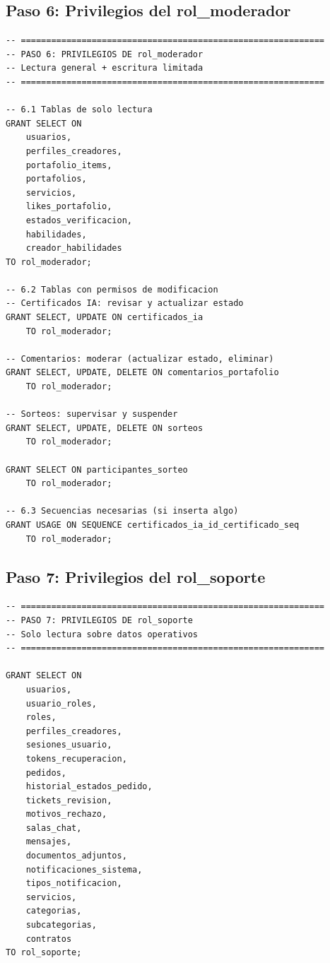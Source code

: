 \documentclass[conference, onecolumn]{IEEEtran}
\begin{document}
\subsection{Paso 6: Privilegios del rol\_moderador}

\begin{lstlisting}[caption={Privilegios granulares del moderador}, label={lst:priv_moderador}]
-- ============================================================
-- PASO 6: PRIVILEGIOS DE rol_moderador
-- Lectura general + escritura limitada
-- ============================================================

-- 6.1 Tablas de solo lectura
GRANT SELECT ON
    usuarios,
    perfiles_creadores,
    portafolio_items,
    portafolios,
    servicios,
    likes_portafolio,
    estados_verificacion,
    habilidades,
    creador_habilidades
TO rol_moderador;

-- 6.2 Tablas con permisos de modificacion
-- Certificados IA: revisar y actualizar estado
GRANT SELECT, UPDATE ON certificados_ia
    TO rol_moderador;

-- Comentarios: moderar (actualizar estado, eliminar)
GRANT SELECT, UPDATE, DELETE ON comentarios_portafolio
    TO rol_moderador;

-- Sorteos: supervisar y suspender
GRANT SELECT, UPDATE, DELETE ON sorteos
    TO rol_moderador;

GRANT SELECT ON participantes_sorteo
    TO rol_moderador;

-- 6.3 Secuencias necesarias (si inserta algo)
GRANT USAGE ON SEQUENCE certificados_ia_id_certificado_seq
    TO rol_moderador;
\end{lstlisting}

\subsection{Paso 7: Privilegios del rol\_soporte}

\begin{lstlisting}[caption={Privilegios de solo lectura del soporte}, label={lst:priv_soporte}]
-- ============================================================
-- PASO 7: PRIVILEGIOS DE rol_soporte
-- Solo lectura sobre datos operativos
-- ============================================================

GRANT SELECT ON
    usuarios,
    usuario_roles,
    roles,
    perfiles_creadores,
    sesiones_usuario,
    tokens_recuperacion,
    pedidos,
    historial_estados_pedido,
    tickets_revision,
    motivos_rechazo,
    salas_chat,
    mensajes,
    documentos_adjuntos,
    notificaciones_sistema,
    tipos_notificacion,
    servicios,
    categorias,
    subcategorias,
    contratos
TO rol_soporte;
\end{lstlisting}
\end{document}
